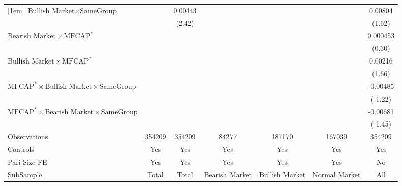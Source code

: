 {\begin{tabular}{l*{6}{c}}
[1em]
$ {\text{Bullish Market} } \times {\text{SameGroup} }  $ &                  &  0.00443\sym{*}  &                  &                  &                  &  0.00804         \\
                &                  &   (2.42)         &                  &                  &                  &   (1.62)         \\
[1em]
$ {\text{Bearish Market} } \times \text{MFCAP}^*  $ &                  &                  &                  &                  &                  & 0.000453         \\
                &                  &                  &                  &                  &                  &   (0.30)         \\
[1em]
$ {\text{Bullish Market} } \times \text{MFCAP}^*   $ &                  &                  &                  &                  &                  &  0.00216         \\
                &                  &                  &                  &                  &                  &   (1.66)         \\
[1em]
$ \text{MFCAP}^* \times {\text{Bullish Market}} \times {\text{SameGroup} }  $ &                  &                  &                  &                  &                  & -0.00485         \\
                &                  &                  &                  &                  &                  &  (-1.22)         \\
[1em]
$ \text{MFCAP}^* \times {\text{Bearish Market}} \times {\text{SameGroup} }  $ &                  &                  &                  &                  &                  & -0.00681         \\
                &                  &                  &                  &                  &                  &  (-1.45)         \\
\hline
Observations    &   354209         &   354209         &    84277         &   187170         &   167039         &   354209         \\
Controls        &      Yes         &      Yes         &      Yes         &      Yes         &      Yes         &      Yes         \\
Pari Size FE    &      Yes         &      Yes         &      Yes         &      Yes         &      Yes         &       No         \\
SubSample       &    Total         &    Total         &Bearish Market         &Bullish Market         &Normal Market         &      All         \\

\end{tabular}}
